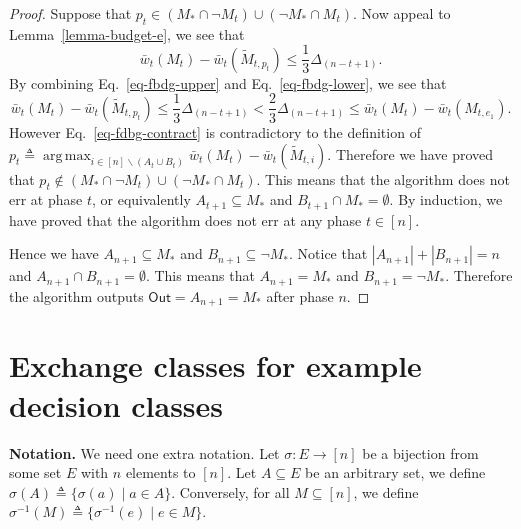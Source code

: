 \documentclass{article}
\newcommand{\del}{\backslash}
\DeclareMathOperator*{\argmax}{arg\,max}
\newcommand{\out}{\mathsf{Out}}
\begin{document}
\begin{proof}
Suppose that $p_t \in (M_* \cap \neg M_t) \cup (\neg M_* \cap M_t)$.
Now appeal to Lemma~\ref{lemma-budget-e}, we see that
\begin{equation}
\label{eq-fbdg-lower}
\bar w_t(M_t) - \bar w_t(\tilde M_{t,p_t}) \le \frac{1}{3} \Delta_{(n-t+1)}.
\end{equation}
By combining Eq.~\eqref{eq-fbdg-upper} and Eq.~\eqref{eq-fbdg-lower}, we see that
\begin{equation}
\bar w_t(M_t) - \bar w_t(\tilde M_{t,p_t}) \le \frac{1}{3} \Delta_{(n-t+1)} < \frac{2}3 \Delta_{(n-t+1)} \le \bar w_t(M_t)- \bar w_t(M_{t,e_1}).
\label{eq-fdbg-contract}
\end{equation}
However Eq.~\eqref{eq-fdbg-contract} is contradictory to the definition of $p_t \triangleq \argmax_{i\in [n]\del (A_t\cup B_t)} \bar w_t(M_t)- \bar w_t(\tilde M_{t,i})$.
Therefore we have proved that $p_t \not\in (M_* \cap \neg M_t) \cup (\neg M_* \cap M_t)$.
This means that the algorithm does not err at phase $t$, or equivalently $A_{t+1} \subseteq M_*$ and $B_{t+1}\cap M_* = \emptyset$.
By induction, we have proved that the algorithm does not err at any phase $t\in[n]$.

Hence we have $A_{n+1} \subseteq M_*$ and $B_{n+1}\subseteq  \neg M_*$.
Notice that $|A_{n+1}| + |B_{n+1}| = n$ and $A_{n+1}\cap B_{n+1}=\emptyset$. This means that $A_{n+1} = M_*$ and $B_{n+1} = \neg M_*$.
Therefore the algorithm outputs $\out=A_{n+1}=M_*$ after phase $n$.
\end{proof}

\section{Exchange classes for example decision classes}


\textbf{Notation.} We need one extra notation.
Let $\sigma: E\rightarrow [n]$ be a bijection from some set $E$ with $n$ elements to $[n]$.
Let $A\subseteq E$ be an arbitrary set, we define $\sigma(A) \triangleq \{\sigma(a) \mid  a\in A\}$.
Conversely, for all $M\subseteq[n]$, we define $\sigma^{-1}(M) \triangleq \{\sigma^{-1}(e) \mid e\in M\}$.
\end{document}

